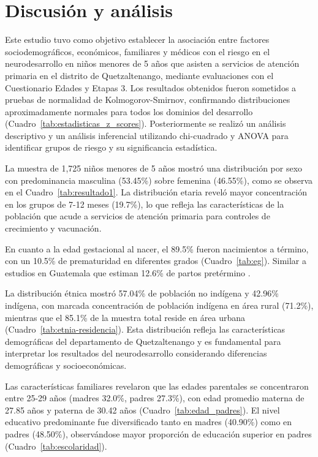 \chapter{Discusión y análisis}
Este estudio tuvo como objetivo establecer la asociación entre factores 
sociodemográficos, económicos, familiares y médicos con el riesgo en el 
neurodesarrollo en niños menores de 5 años que asisten a servicios de atención 
primaria en el distrito de Quetzaltenango, mediante evaluaciones con el
Cuestionario Edades y Etapas 3. Los resultados obtenidos fueron sometidos a
pruebas de  normalidad de Kolmogorov-Smirnov, confirmando distribuciones
aproximadamente  normales para todos los dominios del desarrollo 
(Cuadro~\ref{tab:estadisticas_z_scores}). Posteriormente se realizó un análisis 
descriptivo y un análisis inferencial utilizando chi-cuadrado y ANOVA para
identificar grupos de riesgo y su significancia estadística.

La muestra de 1,725 niños menores de 5 años mostró una distribución por sexo 
con predominancia masculina (53.45\%) sobre femenina (46.55\%), como se 
observa en el Cuadro~\ref{tab:resultado1}. La distribución etaria reveló mayor 
concentración en los grupos de 7-12 meses (19.7\%), lo que refleja las
características de la población que acude a servicios de 
atención primaria para controles de crecimiento y vacunación. 

En cuanto a la edad gestacional al nacer, el 89.5\% fueron nacimientos a 
término, con un 10.5\% de prematuridad en diferentes grados 
(Cuadro~\ref{tab:eg}). Similar a estudios en Guatemala que estiman 12.6\% de partos pretérmino \cite{Pusdekar2020}.

La distribución étnica mostró 57.04\% de población no indígena y 42.96\% 
indígena, con marcada concentración de población indígena en área rural 
(71.2\%), mientras que el 85.1\% de la muestra total reside en área urbana 
(Cuadro~\ref{tab:etnia-residencia}). Esta distribución refleja las 
características demográficas del departamento de Quetzaltenango y es 
fundamental para interpretar los resultados del neurodesarrollo considerando 
diferencias demográficas y socioeconómicas.

Las características familiares revelaron que las edades parentales se 
concentraron entre 25-29 años (madres 32.0\%, padres 27.3\%), con edad 
promedio materna de 27.85 años y paterna de 30.42 años 
(Cuadro~\ref{tab:edad_padres}). El nivel educativo predominante fue 
diversificado tanto en madres (40.90\%) como en padres (48.50\%), 
observándose mayor proporción de educación superior en padres 
(Cuadro~\ref{tab:escolaridad}).

